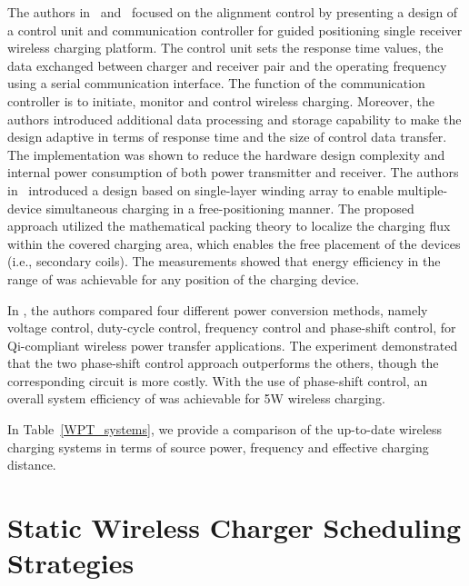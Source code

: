\documentclass[twocolumn,10pt]{IEEEtran}
\begin{document}
The authors in~\cite{Tiwari2013} and~\cite{X.2011Zhong} focused on the alignment control by presenting a design of a control unit and communication controller for guided positioning single receiver wireless charging platform. The control unit sets the response time values, the data exchanged between charger and receiver pair and the operating frequency using a serial communication interface. The function of the communication controller is to initiate, monitor and control wireless charging. Moreover, the authors introduced additional data processing and storage capability to make the design adaptive in terms of response time and the size of control data transfer. The implementation was shown to reduce the hardware design complexity and internal power consumption of both power transmitter and receiver.
The authors in~\cite{X.2011Zhong} introduced a design based on single-layer winding array to enable multiple-device simultaneous charging in a free-positioning manner. The proposed approach utilized the mathematical packing theory to localize the charging flux within the covered charging area, which enables the free placement of the devices (i.e., secondary coils). The measurements showed that energy efficiency in the range of  was achievable for any position of the charging device. 
 
In \cite{P.2010Choi}, the authors compared four different power conversion methods, namely voltage control, duty-cycle control, frequency control and phase-shift control, for Qi-compliant wireless power transfer applications. The experiment demonstrated that the two phase-shift control approach outperforms the others, though the corresponding circuit is more costly. With the use of phase-shift control, an overall system efficiency of  was achievable for 5W wireless charging. 
                                                                                           
 

In Table~\ref{WPT_systems}, we provide a comparison of the up-to-date wireless charging systems in terms of source power, frequency and effective charging distance.



\section{Static Wireless Charger Scheduling Strategies}
\end{document}
